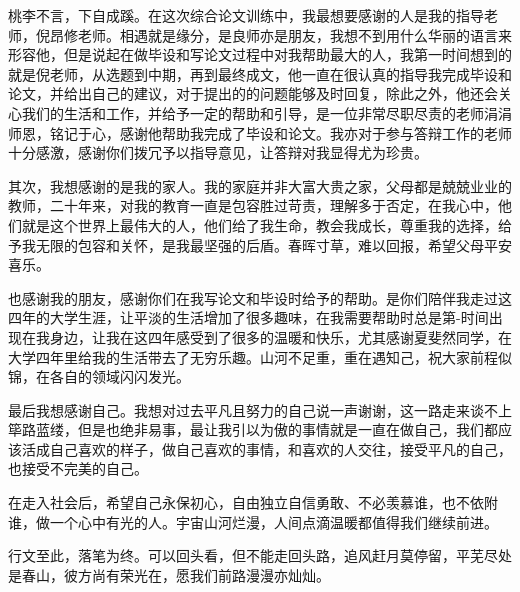 \documentclass[12pt,a4paper]{amsart}
\begin{document}
桃李不言，下自成蹊。在这次综合论文训练中，我最想要感谢的人是我的指导老师，倪昂修老师。相遇就是缘分，是良师亦是朋友，我想不到用什么华丽的语言来形容他，但是说起在做毕设和写论文过程中对我帮助最大的人，我第一时间想到的就是倪老师，从选题到中期，再到最终成文，他一直在很认真的指导我完成毕设和论文，并给出自己的建议，对于提出的的问题能够及时回复，除此之外，他还会关心我们的生活和工作，并给予一定的帮助和引导，是一位非常尽职尽责的老师涓涓师恩，铭记于心，感谢他帮助我完成了毕设和论文。我亦对于参与答辩工作的老师十分感激，感谢你们拨冗予以指导意见，让答辩对我显得尤为珍贵。

其次，我想感谢的是我的家人。我的家庭并非大富大贵之家，父母都是兢兢业业的教师，二十年来，对我的教育一直是包容胜过苛责，理解多于否定，在我心中，他们就是这个世界上最伟大的人，他们给了我生命，教会我成长，尊重我的选择，给予我无限的包容和关怀，是我最坚强的后盾。春晖寸草，难以回报，希望父母平安喜乐。

也感谢我的朋友，感谢你们在我写论文和毕设时给予的帮助。是你们陪伴我走过这四年的大学生涯，让平淡的生活增加了很多趣味，在我需要帮助时总是第-时间出现在我身边，让我在这四年感受到了很多的温暖和快乐，尤其感谢夏斐然同学，在大学四年里给我的生活带去了无穷乐趣。山河不足重，重在遇知己，祝大家前程似锦，在各自的领域闪闪发光。

最后我想感谢自己。我想对过去平凡且努力的自己说一声谢谢，这一路走来谈不上筚路蓝缕，但是也绝非易事，最让我引以为傲的事情就是一直在做自己，我们都应该活成自己喜欢的样子，做自己喜欢的事情，和喜欢的人交往，接受平凡的自己，也接受不完美的自己。

在走入社会后，希望自己永保初心，自由独立自信勇敢、不必羡慕谁，也不依附谁，做一个心中有光的人。宇宙山河烂漫，人间点滴温暖都值得我们继续前进。

行文至此，落笔为终。可以回头看，但不能走回头路，追风赶月莫停留，平芜尽处是春山，彼方尚有荣光在，愿我们前路漫漫亦灿灿。

\appendix

{\footnotesize}
\end{document}
